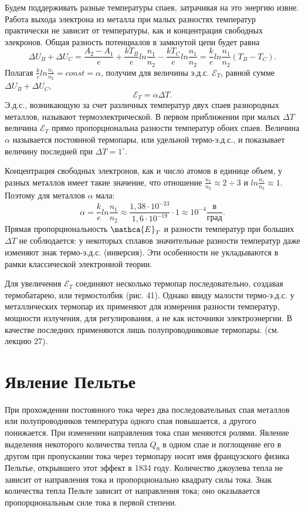 \documentclass[a4paper,10pt]{book}
\begin{document}
Будем поддерживать разные температуры спаев, затрачивая на это энергию извне. Работа выхода электрона из металла при малых разностях температур практически не зависит от температуры, как и концентрация свободных элекронов. Общая разность потенциалов в замкнутой цепи будет равна
\begin{equation}\label{197}
 \Delta U_B + \Delta U_C = \frac{A_2 - A_1}{e} + \frac{kT_B}{e}ln\frac{n_1}{n_2} - \frac{kT_C}{e}ln\frac{n_1}{n_2} = \frac{k}{e}ln\frac{n_1}{n_2}(T_B - T_C).
\end{equation}
Полагая $\frac{k}{e}ln\frac{n_1}{n_2} = const = \alpha$, получим для величины э.д.с. $\mathcal{E}_T$, равной сумме $\Delta U_B + \Delta U_C$,
\begin{equation}\label{198}
 \mathcal{E}_T = \alpha\Delta T.
\end{equation}
Э.д.с., возникающую за счет различных температур двух спаев разнородных металлов, называют термоэлектрической. В первом приближении при малых $\Delta T$ величина $\mathcal{E}_T$ прямо пропорциональна разности температур обоих спаев. Величина $\alpha$ называется постоянной термопары, или удельной термо-э.д.с., и показывает величину последней при $\Delta T = 1^\circ$.

Концентрация свободных электронов, как и число атомов в единице объем, у разных металлов имеет такие значение, что отношение $\frac{n_1}{n_2} \approx 2 \div 3$ и $ln\frac{n_1}{n_2} \approx 1$. Поэтому для металлов $\alpha$ мала:
\begin{equation*}
 \alpha = \frac{k}{e}ln\frac{n_1}{n_2} \approx \frac{1,38\cdot 10^{-23}}{1,6\cdot 10^{-19}}\cdot 1 \approx 10^{-4}\frac{\text{в}}{\text{град}}.
\end{equation*}
Прямая пропорциональность $\mathca{E}_T$ и разности температур при больших $\Delta T$ не соблюдается: у некоторых сплавов значительные разности температур даже изменяют знак термо-э.д.с. (инверсия). Эти особенности не укладываются в рамки классической электронной теории.

Для увеличения $\mathcal{E}_T$ соединяют несколько термопар последовательно, создавая термобатарею, или термостолбик (рис. 41).
Однако ввиду малости термо-э.д.с. у металлических термопар их применяют для измерения разности температур, мощности излучения, для регулирования, а не как источники электроэнергии. В качестве последних применяются лишь полупроводниковые термопары. (см. лекцию 27).
\section{Явление Пельтье}
При прохождении постоянного тока через два последовательных спая металлов или полупроводников температура одного спая повышается, а другого понижается. При изменении направления тока спаи меняются ролями. Явление выделения некоторого количества тепла $Q_\text{п}$ в одном спае и поглощение его в другом при пропускании тока через термопару носит имя французского физика Пельтье, открывшего этот эффект в 1834 году. Количество джоулева тепла не зависит от направления тока и пропорционально квадрату силы тока. Знак количества тепла Пельте зависит от направления тока; оно оказывается пропорциональным силе тока в первой степени.
\end{document}
